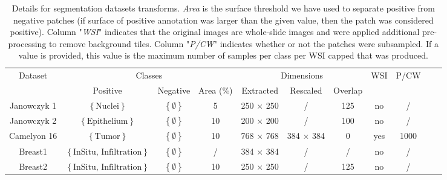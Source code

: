 \begin{table*}[t]
\center
\caption{Details for segmentation datasets transforms. \textit{Area} is the surface threshold we have used to separate positive from negative patches (if surface of positive annotation was larger than the given value, then the patch was considered positive). Column "\textit{WSI}" indicates that the original images are whole-slide images and were applied additional pre-processing to remove background tiles. Column "\textit{P/CW}" indicates whether or not the patches were subsampled. If a value is provided, this value is the maximum number of samples per class per WSI capped that was produced.}
\label{app:mtask:tab:app:details_trans_seg}
\begin{tabular}{|c|c|c|c|c|c|c|c|c|c|c|}
\hline
\multirow{2}{*}{Dataset} & \multicolumn{3}{c}{Classes} & \multicolumn{3}{|c|}{Dimensions} & \multirow{2}{*}{WSI} & \multirow{2}{*}{P/CW} \\
\cline{2-7}
 & Positive & Negative & Area {\small($\%$)} & Extracted & Rescaled & Overlap & & \\
\hline
Janowczyk 1 & {\small $\left\{\text{Nuclei}\right\}$} &  {\small $\left\{\emptyset\right\}$} & 5 & 250 $\times$ 250 & / & 125 & no & / \\
Janowczyk 2 & {\small $\left\{\text{Epithelium}\right\}$} &  {\small $\left\{\emptyset\right\}$} & 10 & 200 $\times$ 200 & / & 100 & no & / \\
Camelyon 16 & {\small $\left\{\text{Tumor}\right\}$} &  {\small $\left\{\emptyset\right\}$} & 10 & 768 $\times$ 768 & 384 $\times$ 384 & 0 & yes & 1000 \\
Breast1 & {\small $\left\{\text{InSitu, Infiltration}\right\}$} & {\small $\left\{\emptyset\right\}$} & / & 384 $\times$ 384 & / & / & no & /\\
Breast2 & {\small $\left\{\text{InSitu, Infiltration}\right\}$} & {\small $\left\{\emptyset\right\}$} & 10 & 250 $\times$ 250 & / & 125 & no & /\\
\hline
\end{tabular}
\end{table*}

